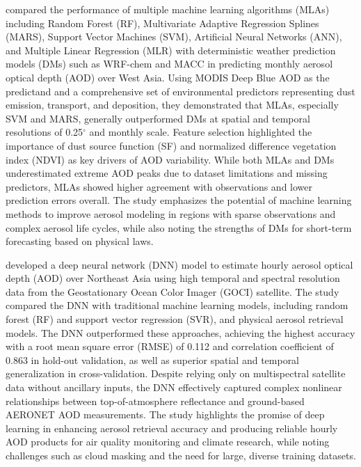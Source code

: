 \documentclass[11pt]{article}
\begin{document}
\citet{nabavi2018prediction} compared the performance of multiple machine learning algorithms (MLAs) including Random Forest (RF), Multivariate Adaptive Regression Splines (MARS), Support Vector Machines (SVM), Artificial Neural Networks (ANN), and Multiple Linear Regression (MLR) with deterministic weather prediction models (DMs) such as WRF-chem and MACC in predicting monthly aerosol optical depth (AOD) over West Asia. Using MODIS Deep Blue AOD as the predictand and a comprehensive set of environmental predictors representing dust emission, transport, and deposition, they demonstrated that MLAs, especially SVM and MARS, generally outperformed DMs at spatial and temporal resolutions of 0.25$^\circ$ and monthly scale. Feature selection highlighted the importance of dust source function (SF) and normalized difference vegetation index (NDVI) as key drivers of AOD variability. While both MLAs and DMs underestimated extreme AOD peaks due to dataset limitations and missing predictors, MLAs showed higher agreement with observations and lower prediction errors overall. The study emphasizes the potential of machine learning methods to improve aerosol modeling in regions with sparse observations and complex aerosol life cycles, while also noting the strengths of DMs for short-term forecasting based on physical laws.

\citet{yeom2021estimation} developed a deep neural network (DNN) model to estimate hourly aerosol optical depth (AOD) over Northeast Asia using high temporal and spectral resolution data from the Geostationary Ocean Color Imager (GOCI) satellite. The study compared the DNN with traditional machine learning models, including random forest (RF) and support vector regression (SVR), and physical aerosol retrieval models. The DNN outperformed these approaches, achieving the highest accuracy with a root mean square error (RMSE) of 0.112 and correlation coefficient of 0.863 in hold-out validation, as well as superior spatial and temporal generalization in cross-validation. Despite relying only on multispectral satellite data without ancillary inputs, the DNN effectively captured complex nonlinear relationships between top-of-atmosphere reflectance and ground-based AERONET AOD measurements. The study highlights the promise of deep learning in enhancing aerosol retrieval accuracy and producing reliable hourly AOD products for air quality monitoring and climate research, while noting challenges such as cloud masking and the need for large, diverse training datasets.
\end{document}
